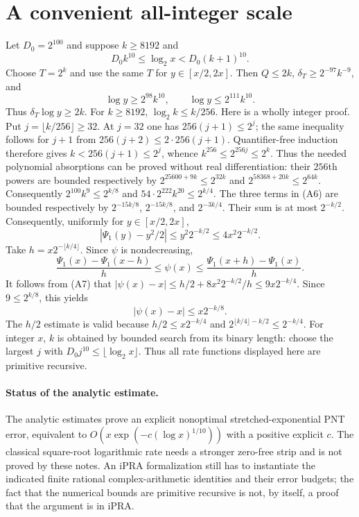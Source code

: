 \section{A convenient all-integer scale}
Let $D_0=2^{100}$ and suppose $k\ge8192$ and
\[
 D_0 k^{10}\le\log_2x<D_0(k+1)^{10}.
\]
Choose $T=2^k$ and use the same $T$ for $y\in[x/2,2x]$.
Then $Q\le2k$, $\delta_T\ge2^{-97}k^{-9}$, and
\[
 \log y\ge2^{98}k^{10},\qquad \log y\le2^{111}k^{10}.
\]
Thus $\delta_T\log y\ge2k$.
For $k\ge8192$, $\log_2k\le k/256$. Here is a wholly integer proof.
Put $j=\lfloor k/256\rfloor\ge32$. At $j=32$ one has
$256(j+1)\le2^j$; the same inequality follows for $j+1$ from
$256(j+2)\le2\cdot256(j+1)$. Quantifier-free induction therefore gives
$k<256(j+1)\le2^j$, whence $k^{256}\le2^{256j}\le2^k$.
Thus the needed polynomial absorptions can be proved without real
differentiation: their $256$th powers are bounded respectively by
$2^{25600+9k}\le2^{32k}$ and
$2^{58368+20k}\le2^{64k}$. Consequently
$2^{100}k^9\le2^{k/8}$ and $54\cdot2^{222}k^{20}\le2^{k/4}$.
The three terms in (A6) are bounded respectively by
$2^{-15k/8}$, $2^{-15k/8}$, and $2^{-3k/4}$.
Their sum is at most $2^{-k/2}$.
Consequently, uniformly for $y\in[x/2,2x]$,
\[
 \left|\Psi_1(y)-y^2/2\right|\le y^2 2^{-k/2}
 \le4x^2 2^{-k/2}.                                         \tag{A7}
\]
Take $h=x2^{-\lfloor k/4\rfloor}$. Since $\psi$ is nondecreasing,
\[
 \frac{\Psi_1(x)-\Psi_1(x-h)}h\le\psi(x)
 \le\frac{\Psi_1(x+h)-\Psi_1(x)}h.
\]
It follows from (A7) that
$|\psi(x)-x|\le h/2+8x^2 2^{-k/2}/h\le9x2^{-k/4}$.
Since $9\le2^{k/8}$, this yields
\[
                    |\psi(x)-x|\le x2^{-k/8}.               \tag{A8}
\]
The $h/2$ estimate is valid because
$h/2\le x2^{-k/4}$ and $2^{\lfloor k/4\rfloor-k/2}\le2^{-k/4}$.
For integer $x$, $k$ is obtained by bounded search from its binary length:
choose the largest $j$ with $D_0 j^{10}\le\lfloor\log_2x\rfloor$.
Thus all rate functions displayed here are primitive recursive.

\paragraph{Status of the analytic estimate.}
The analytic estimates prove an explicit nonoptimal stretched-exponential
PNT error, equivalent to $O(x\exp(-c(\log x)^{1/10}))$ with a positive
explicit $c$. The classical square-root logarithmic rate needs a stronger
zero-free strip and is not proved by these notes. An iPRA formalization
still has to instantiate the indicated finite rational complex-arithmetic
identities and their error budgets; the fact that the numerical bounds are
primitive recursive is not, by itself, a proof that the argument is in iPRA.
